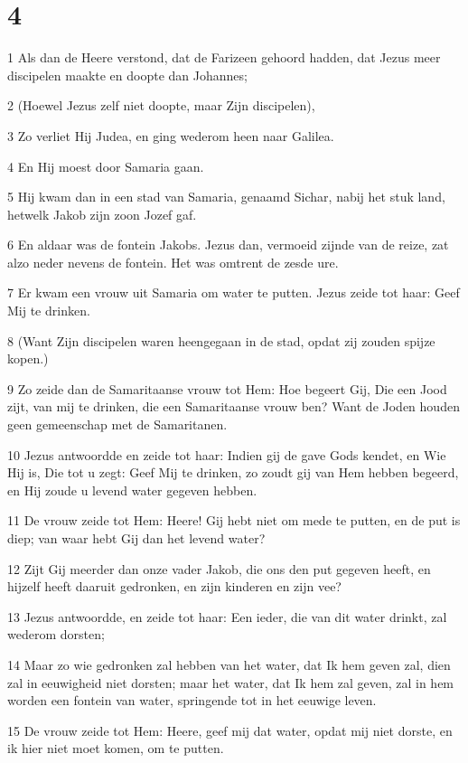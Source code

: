 \chapter{4}

\par 1 Als dan de Heere verstond, dat de Farizeen gehoord hadden, dat Jezus meer discipelen maakte en doopte dan Johannes;
\par 2 (Hoewel Jezus zelf niet doopte, maar Zijn discipelen),
\par 3 Zo verliet Hij Judea, en ging wederom heen naar Galilea.
\par 4 En Hij moest door Samaria gaan.
\par 5 Hij kwam dan in een stad van Samaria, genaamd Sichar, nabij het stuk land, hetwelk Jakob zijn zoon Jozef gaf.
\par 6 En aldaar was de fontein Jakobs. Jezus dan, vermoeid zijnde van de reize, zat alzo neder nevens de fontein. Het was omtrent de zesde ure.
\par 7 Er kwam een vrouw uit Samaria om water te putten. Jezus zeide tot haar: Geef Mij te drinken.
\par 8 (Want Zijn discipelen waren heengegaan in de stad, opdat zij zouden spijze kopen.)
\par 9 Zo zeide dan de Samaritaanse vrouw tot Hem: Hoe begeert Gij, Die een Jood zijt, van mij te drinken, die een Samaritaanse vrouw ben? Want de Joden houden geen gemeenschap met de Samaritanen.
\par 10 Jezus antwoordde en zeide tot haar: Indien gij de gave Gods kendet, en Wie Hij is, Die tot u zegt: Geef Mij te drinken, zo zoudt gij van Hem hebben begeerd, en Hij zoude u levend water gegeven hebben.
\par 11 De vrouw zeide tot Hem: Heere! Gij hebt niet om mede te putten, en de put is diep; van waar hebt Gij dan het levend water?
\par 12 Zijt Gij meerder dan onze vader Jakob, die ons den put gegeven heeft, en hijzelf heeft daaruit gedronken, en zijn kinderen en zijn vee?
\par 13 Jezus antwoordde, en zeide tot haar: Een ieder, die van dit water drinkt, zal wederom dorsten;
\par 14 Maar zo wie gedronken zal hebben van het water, dat Ik hem geven zal, dien zal in eeuwigheid niet dorsten; maar het water, dat Ik hem zal geven, zal in hem worden een fontein van water, springende tot in het eeuwige leven.
\par 15 De vrouw zeide tot Hem: Heere, geef mij dat water, opdat mij niet dorste, en ik hier niet moet komen, om te putten.
